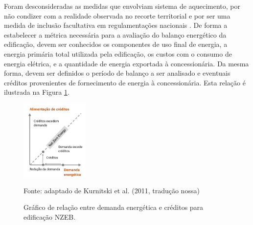 \vspace{-0.4cm} \noindent Foram desconsideradas as medidas que envolviam sistema de aquecimento, por não condizer 
com a realidade observada no recorte territorial e por ser uma medida de inclusão facultativa 
em regulamentações nacionais \cite{InstitutoNacionaldeMetrologiaNormalizacaoeQualidadeIndustrial-INMETRO2018,InstitutoNacionaldeMetrologiaNormalizacaoeQualidadeIndustrial-INMETRO2018a}.
De forma a estabelecer a métrica necessária para a avaliação do balanço energético da edificação, 
devem ser conhecidos os componentes de uso final de energia, a energia primária total utilizada 
pela edificação, os custos com o consumo de energia elétrica, e a quantidade de energia 
exportada à concessionária. Da mesma forma, devem ser definidos o período de balanço a ser 
analisado e eventuais créditos provenientes de fornecimento de energia à concessionária. 
Esta relação é ilustrada na Figura \ref{fig:figura2}.\vspace*{-0.4cm}
    \begin{figure}[ht]
        \centering
        \caption{Gráfico de relação entre demanda energética e créditos para edificação NZEB.}\small
        \includegraphics[width=0.3\textwidth]{figures/esquema_iea_2014-2.png}
        \begin{flushleft}
            \par \small Fonte: adaptado de Kurnitski et al. (2011, tradução nossa)            
        \end{flushleft}
        \label{fig:figura2}
    \end{figure}